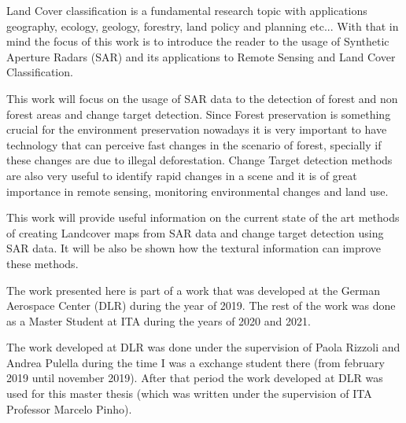 Land Cover classification is a fundamental research topic with applications geography,
ecology, geology, forestry, land policy and planning etc... 
With that in mind the focus of this work is to introduce the reader to the usage of Synthetic Aperture Radars (SAR) 
and its applications to Remote Sensing and Land Cover Classification. 

This work will focus on the usage of SAR data to the detection of forest and non forest areas and change target detection. 
Since Forest preservation is something crucial for the environment preservation nowadays it is very important to have technology 
that can perceive fast changes in the scenario of forest, specially if these changes are due to illegal deforestation. 
Change Target detection methods are also very useful to identify rapid changes in a scene and it is of great importance in remote sensing, monitoring environmental changes and land use. 

This work will provide useful information on the current state of the art methods of creating Landcover 
maps from SAR data and change target detection using SAR data. It will be also be shown how the textural information can improve these methods.

The work presented here is part of a work that was developed at the German Aerospace Center (DLR) 
during the year of 2019. The rest of the work was done as a Master Student at ITA during the years of 2020 and 2021.

The work developed at DLR was done under the supervision of Paola Rizzoli and Andrea Pulella 
during the time I was a exchange student there (from february 2019 until november 2019). 
After that period the work developed at DLR was used for this master thesis 
(which was written under the supervision of ITA Professor Marcelo Pinho).